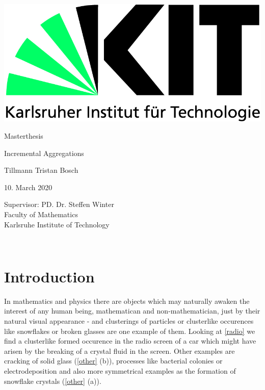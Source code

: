\documentclass[12pt,a4paper]{scrartcl}
\numberwithin{equation}{subsection}
\newcommand{\1}{\mathbbm{1}}
\numberwithin{equation}{section}
\theoremstyle{definition}
\begin{document}
	\pagestyle{empty}

\begin{titlepage}

	\includegraphics[scale=0.45]{images/kit-logo.jpg} 
    \vspace*{2cm} 
\begin{center} \large 
    
   Masterthesis
    \vspace*{2cm}

    {\huge Incremental Aggregations}\\
    \vspace*{2.5cm}

    Tillmann Tristan Bosch
    \vspace*{1.5cm}

    10. March 2020
    \vspace*{3.5cm}


    Supervisor: PD. Dr. Steffen Winter \\[1cm]
    Faculty of Mathematics\\[1cm]
	Karlsruhe Institute of Technology
\end{center}
\end{titlepage}

\newpage

\newpage
\phantom \\
\newpage

\tableofcontents %

 	\pagestyle{headings}

\setcounter{page}{1}


\newpage

\section{Introduction}
	In mathematics and physics there are objects which may naturally awaken the interest of any human being, mathematican and non-mathematician, just by their natural visual appearance - and clusterings of particles or clusterlike occurences like snowflakes or broken glasses are one example of them. Looking at \autoref{radio} we find a clusterlike formed occurence in the radio screen of a car which might have arisen by the breaking of a crystal fluid in the screen. Other examples are cracking of solid glass (\autoref{other} (b)), processes like bacterial colonies or electrodeposition and also more symmetrical examples as the formation of snowflake crystals (\autoref{other} (a)). \\
	
\end{document}

